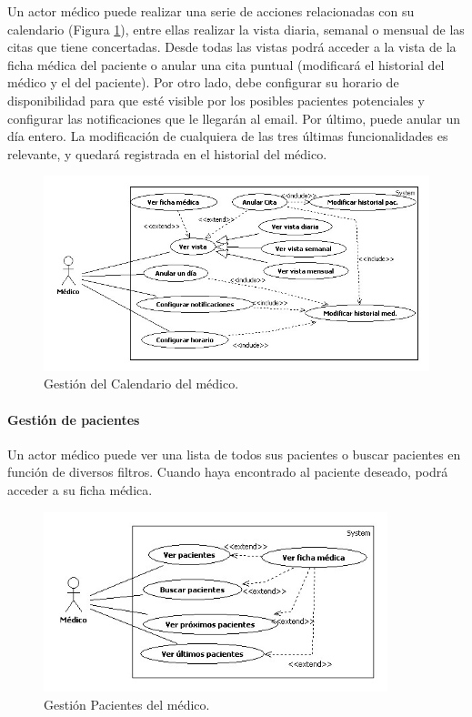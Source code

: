 \documentclass[a4paper,oneside,11pt]{book}
\begin{document}
				Un actor médico puede realizar una serie de acciones relacionadas con su calendario (Figura \ref{fig:cal_med}), entre ellas realizar la vista diaria, semanal o mensual de las citas que tiene concertadas. Desde todas las vistas podrá acceder a la vista de la ficha médica del paciente o anular una cita puntual (modificará el historial del médico y el del paciente). Por otro lado, debe configurar su horario de disponibilidad para que esté visible por los posibles pacientes potenciales y configurar las notificaciones que le llegarán al email. Por último, puede anular un día entero. La modificación de cualquiera de las tres últimas funcionalidades es relevante, y quedará registrada en el historial del médico.
				\begin{figure}[H]
				  \centering
				    \includegraphics[width=14cm]{img/jpg/casos_uso/Gestion_calendario.jpg}
				  \caption{Gestión del Calendario del médico.}
				  \label{fig:cal_med}
				\end{figure}
		
			\paragraph{Gestión de pacientes} %
			\label{par:gestion_de_pacientes}
				Un actor médico puede ver una lista de todos sus pacientes o buscar pacientes en función de diversos filtros. Cuando haya encontrado al paciente deseado, podrá acceder a su ficha médica.
				\begin{figure}[H]
				  \centering
				    \includegraphics[width=10cm]{img/jpg/casos_uso/Gestion_Pacientes.jpg}
				  \caption{Gestión Pacientes del médico.}
				  \label{fig:pac_med}
				\end{figure}
		
\end{document}
